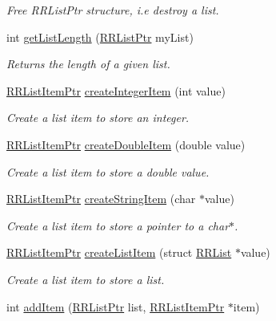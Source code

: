 \begin{DoxyCompactItemize}
\begin{DoxyCompactList}\small\item\em Free R\+R\+List\+Ptr structure, i.\+e destroy a list. \end{DoxyCompactList}\item 
int \hyperlink{group__list_ga4e64dc563715bec1bc7f026ac3daeca0}{get\+List\+Length} (\hyperlink{rrc__types_8h_a32a8a60ac06858ff3a791672bd2bec73}{R\+R\+List\+Ptr} my\+List)
\begin{DoxyCompactList}\small\item\em Returns the length of a given list. \end{DoxyCompactList}\item 
\hyperlink{rrc__types_8h_a79938364b69256c42480bb3a29ebf73e}{R\+R\+List\+Item\+Ptr} \hyperlink{group__list_ga1e385c28b44b23310db9811df2ba65ca}{create\+Integer\+Item} (int value)
\begin{DoxyCompactList}\small\item\em Create a list item to store an integer. \end{DoxyCompactList}\item 
\hyperlink{rrc__types_8h_a79938364b69256c42480bb3a29ebf73e}{R\+R\+List\+Item\+Ptr} \hyperlink{group__list_gaa61ed635b56855236a98505603f0f555}{create\+Double\+Item} (double value)
\begin{DoxyCompactList}\small\item\em Create a list item to store a double value. \end{DoxyCompactList}\item 
\hyperlink{rrc__types_8h_a79938364b69256c42480bb3a29ebf73e}{R\+R\+List\+Item\+Ptr} \hyperlink{group__list_ga1e1d689f107c91c0d300f0ea9a4cd018}{create\+String\+Item} (char $\ast$value)
\begin{DoxyCompactList}\small\item\em Create a list item to store a pointer to a char$\ast$. \end{DoxyCompactList}\item 
\hyperlink{rrc__types_8h_a79938364b69256c42480bb3a29ebf73e}{R\+R\+List\+Item\+Ptr} \hyperlink{group__list_ga829d2f599093a059c771dc49b0034ac1}{create\+List\+Item} (struct \hyperlink{struct_r_r_list}{R\+R\+List} $\ast$value)
\begin{DoxyCompactList}\small\item\em Create a list item to store a list. \end{DoxyCompactList}\item 
int \hyperlink{group__list_ga62b890cf2f2b2eccb767e86f9c302e61}{add\+Item} (\hyperlink{rrc__types_8h_a32a8a60ac06858ff3a791672bd2bec73}{R\+R\+List\+Ptr} list, \hyperlink{rrc__types_8h_a79938364b69256c42480bb3a29ebf73e}{R\+R\+List\+Item\+Ptr} $\ast$item)

\end{DoxyCompactItemize}

